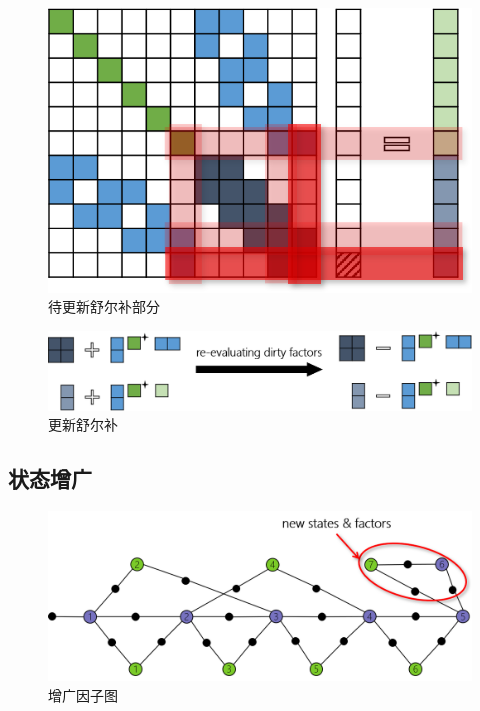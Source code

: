 \begin{figure}[htbp]
    \centering
    \includegraphics{./figs/normal_eq_cursed.png}
    \caption{待更新舒尔补部分}
\end{figure}

\begin{figure}[htbp]
    \centering
    \includegraphics[width=\textwidth]{./figs/schur_update.png}
    \caption{更新舒尔补}
\end{figure}

\subsection{状态增广}

\begin{figure}[htbp]
    \centering
    \includegraphics[width=\textwidth]{./figs/fg_aug.png}
    \caption{增广因子图}
\end{figure}

